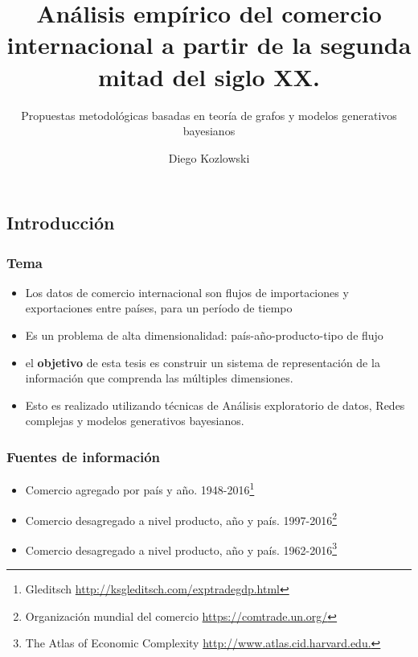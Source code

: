 \documentclass[compress]{beamer}
\title[Defensa de Tesis]{Análisis empírico del comercio internacional a partir de la segunda mitad del siglo XX.}
\subtitle{Propuestas metodológicas basadas en teoría de grafos y modelos generativos
	bayesianos}
\author{Diego Kozlowski}
\institute[Universidad de Buenos Aires]
{
	Universidad de Buenos Aires\\ 
	
	\textit{Master en Data Mining \& Knowledge Discovery} \\
	\medskip
	\textit{Supervisor: Viktoriya Semeshenko}
}
\date{}
\begin{document}
\begin{frame}

\titlepage 

\end{frame}



\begin{frame}

\section{Introducción}


\frametitle{Tema}

\begin{itemize}
	
	\item[\faRebel] Los datos de comercio internacional son flujos de importaciones y exportaciones entre países, para un período de tiempo 
	\item[\faRebel] Es un problema de alta dimensionalidad: país-año-producto-tipo de flujo
	\item[\faRebel] el \textbf{objetivo} de esta tesis es construir un sistema de representación de la información que comprenda las múltiples dimensiones.
	\item[\faRebel] Esto es realizado utilizando técnicas de Análisis exploratorio de datos, Redes complejas y modelos generativos bayesianos. 
\end{itemize}

\end{frame}


\begin{frame}
\frametitle{Fuentes de información}

\begin{itemize}
	
	\item[\faRebel] Comercio agregado por país y año. 1948-2016\footnote{Gleditsch \url{http://ksgleditsch.com/exptradegdp.html}}  
	\item[\faRebel] Comercio desagregado a nivel producto, año y país. 1997-2016\footnote{Organización mundial del comercio \url{https://comtrade.un.org/}}
	\item[\faRebel] Comercio desagregado a nivel producto, año y país. 1962-2016\footnote{The Atlas of Economic Complexity \url{http://www.atlas.cid.harvard.edu.}}	
\end{itemize}

\end{frame}
\end{document}
